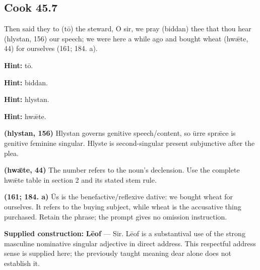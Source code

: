 \par\begin{minipage}{\linewidth}\raggedright
\subsection*{Cook 45.7}

Then said they to (tō) the steward, O sir, we pray (biddan) thee that thou hear (hlystan, 156) our speech; we were here a while ago and bought wheat (hwǣte, 44) for ourselves (161; 184. a).

\textbf{Hint:} tō.

\textbf{Hint:} biddan.

\textbf{Hint:} hlystan.

\textbf{Hint:} hwǣte.

\textbf{(hlystan, 156)} Hlystan governs genitive speech/\allowbreak{}content, so ūrre sprǣce is genitive feminine singular. Hlyste is second-singular present subjunctive after the plea.

\textbf{(hwǣte, 44)} The number refers to the noun’s declension. Use the complete hwǣte table in section 2 and its stated stem rule.

\textbf{(161; 184. a)} Ūs is the benefactive/\allowbreak{}reflexive dative: we bought wheat for ourselves. It refers to the buying subject, while wheat is the accusative thing purchased. Retain the phrase; the prompt gives no omission instruction.

\end{minipage}\par\addvspace{4pt}

\textbf{Supplied construction:} \textbf{Lēof} — Sir. Lēof is a substantival use of the strong masculine nominative singular adjective in direct address. This respectful address sense is supplied here; the previously taught meaning dear alone does not establish it.

